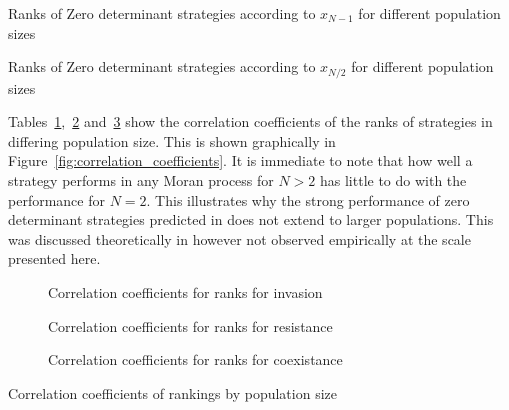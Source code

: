 \documentclass{article}
\begin{document}
\begin{table}[!hbtp]
    \centering
    \scriptsize
    
    \caption{Ranks of Zero determinant strategies according to \(x_{N-1}\) for different
    population sizes}
    \label{tbl:ZD_ranks_v_size_resist}
\end{table}

\begin{table}[!hbtp]
    \centering
    \scriptsize
    
    \caption{Ranks of Zero determinant strategies according to \(x_{N/2}\) for different
    population sizes}
    \label{tbl:ZD_ranks_v_size_coexist}
\end{table}

Tables~\ref{tbl:correlation_coeficients_invade},~\ref{tbl:correlation_coeficients_resist}
and~\ref{tbl:correlation_coeficients_coexist} show the correlation coefficients
of the ranks of strategies in differing population size. This is shown
graphically in Figure~\ref{fig:correlation_coefficients}. It is immediate to
note that how well a strategy performs in any Moran process for \(N>2\) has
little to do with the performance for \(N=2\). This illustrates why the strong
performance of zero determinant strategies predicted in \cite{Press2012} does
not extend to larger populations. This was discussed theoretically in
\cite{Adami2013} however not observed empirically at the scale presented here.

\begin{table}[!hbtp]
    \centering
    \begin{subfigure}{\textwidth}
        \centering
        
        \caption{Correlation coefficients for ranks for invasion}
        \label{tbl:correlation_coeficients_invade}
    \end{subfigure}%

    \begin{subfigure}{\textwidth}
        \centering
        
        \caption{Correlation coefficients for ranks for resistance}
        \label{tbl:correlation_coeficients_resist}
    \end{subfigure}

    \begin{subfigure}{\textwidth}
        \centering
        
        \caption{Correlation coefficients for ranks for coexistance}
        \label{tbl:correlation_coeficients_coexist}
    \end{subfigure}
    \caption{Correlation coefficients of rankings by population size}
\end{table}
\end{document}
